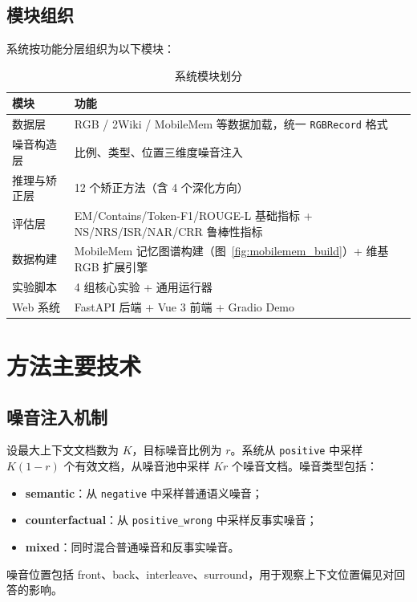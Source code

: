 \documentclass[UTF8,zihao=-4]{ctexart}
\begin{document}
\subsection{模块组织}

系统按功能分层组织为以下模块：

\begin{table}[H]
  \centering
  \caption{系统模块划分}
  \begin{tabularx}{\textwidth}{lY}
    \toprule
    模块 & 功能 \\
    \midrule
    数据层 & RGB / 2Wiki / MobileMem 等数据加载，统一 \texttt{RGBRecord} 格式 \\
    噪音构造层 & 比例、类型、位置三维度噪音注入 \\
    推理与矫正层 & 12 个矫正方法（含 4 个深化方向） \\
    评估层 & EM/Contains/Token-F1/ROUGE-L 基础指标 + NS/NRS/ISR/NAR/CRR 鲁棒性指标 \\
    数据构建 & MobileMem 记忆图谱构建（图~\ref{fig:mobilemem_build}）+ 维基 RGB 扩展引擎 \\
    实验脚本 & 4 组核心实验 + 通用运行器 \\
    Web 系统 & FastAPI 后端 + Vue 3 前端 + Gradio Demo \\
    \bottomrule
  \end{tabularx}
\end{table}

\section{方法主要技术}

\subsection{噪音注入机制}
设最大上下文文档数为 $K$，目标噪音比例为 $r$。系统从 \texttt{positive} 中采样 $K(1-r)$ 个有效文档，从噪音池中采样 $Kr$ 个噪音文档。噪音类型包括：

\begin{itemize}
  \item \textbf{semantic}：从 \texttt{negative} 中采样普通语义噪音；
  \item \textbf{counterfactual}：从 \texttt{positive\_wrong} 中采样反事实噪音；
  \item \textbf{mixed}：同时混合普通噪音和反事实噪音。
\end{itemize}

噪音位置包括 front、back、interleave、surround，用于观察上下文位置偏见对回答的影响。
\end{document}
